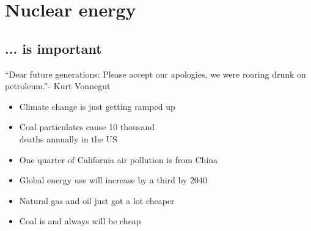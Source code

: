 \documentclass{beamer}
\begin{document}
\section{Nuclear energy}

    \subsection{... is important}

        \begin{frame}{``Dear future generations: Please accept our apologies, we were roaring drunk on petroleum.''}{- Kurt Vonnegut}

            \begin{itemize}

                \item Climate change is just getting ramped up
                \pause
                \item Coal particulates cause 10 thousand \\ deaths annually in the US
                \pause
                \item One quarter of California air pollution is from China
                \pause

                \vspace{2em}

                \item Global energy use will increase by a third by 2040
                \pause
                \item Natural gas and oil just got a lot cheaper
                \pause
                \item Coal is and always will be cheap

            \end{itemize}

        \end{frame}
\end{document}
